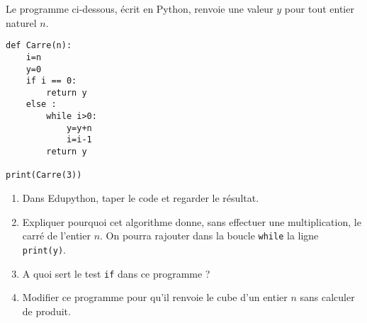 
Le programme ci-dessous, écrit en Python, renvoie une valeur $y$ pour tout entier naturel $n$.

\begin{lstlisting}
def Carre(n):
	i=n
	y=0
	if i == 0:
		return y
	else :
		while i>0:
			y=y+n
			i=i-1
		return y

print(Carre(3))
\end{lstlisting}

\begin{enumerate}
\item Dans Edupython, taper le code et regarder le résultat.
\item Expliquer pourquoi cet algorithme donne, sans effectuer une multiplication, le carré de l'entier $n$. On pourra rajouter dans la boucle \texttt{while} la ligne \texttt{print(y)}.
\item A quoi sert le test \texttt{if} dans ce programme ?
\item Modifier ce programme pour qu'il renvoie le cube d'un entier $n$ sans calculer de produit.
\end{enumerate}